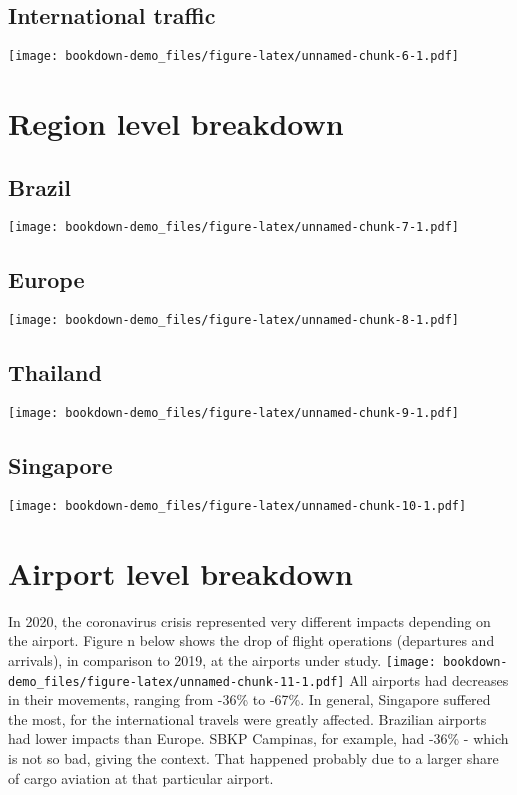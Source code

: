 \documentclass[
]{book}
\begin{document}
\hypertarget{international-traffic}{%
\section{International traffic}\label{international-traffic}}

\texttt{[image: bookdown-demo\_files/figure-latex/unnamed-chunk-6-1.pdf]}

\hypertarget{region-level-breakdown}{%
\chapter{Region level breakdown}\label{region-level-breakdown}}

\hypertarget{brazil}{%
\section{Brazil}\label{brazil}}

\texttt{[image: bookdown-demo\_files/figure-latex/unnamed-chunk-7-1.pdf]}

\hypertarget{europe}{%
\section{Europe}\label{europe}}

\texttt{[image: bookdown-demo\_files/figure-latex/unnamed-chunk-8-1.pdf]}

\hypertarget{thailand}{%
\section{Thailand}\label{thailand}}

\texttt{[image: bookdown-demo\_files/figure-latex/unnamed-chunk-9-1.pdf]}

\hypertarget{singapore}{%
\section{Singapore}\label{singapore}}

\texttt{[image: bookdown-demo\_files/figure-latex/unnamed-chunk-10-1.pdf]}

\hypertarget{airport-level-breakdown}{%
\chapter{Airport level breakdown}\label{airport-level-breakdown}}

In 2020, the coronavirus crisis represented very different impacts depending on the airport. Figure n below shows the drop of flight operations (departures and arrivals), in comparison to 2019, at the airports under study.
\texttt{[image: bookdown-demo\_files/figure-latex/unnamed-chunk-11-1.pdf]}
All airports had decreases in their movements, ranging from -36\% to -67\%. In general, Singapore suffered the most, for the international travels were greatly affected. Brazilian airports had lower impacts than Europe. SBKP Campinas, for example, had -36\% - which is not so bad, giving the context. That happened probably due to a larger share of cargo aviation at that particular airport.
\end{document}
